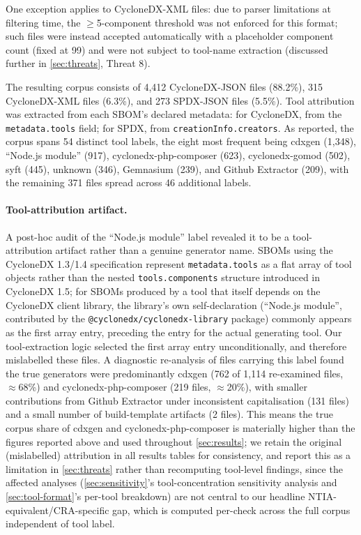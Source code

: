 \documentclass[11pt]{article}
\begin{document}
One exception applies to CycloneDX-XML files: due to parser limitations at filtering time, the $\geq$5-component threshold was not enforced for this format; such files were instead accepted automatically with a placeholder component count (fixed at 99) and were not subject to tool-name extraction (discussed further in \cref{sec:threats}, Threat 8).

The resulting corpus consists of 4,412 CycloneDX-JSON files (88.2\%), 315 CycloneDX-XML files (6.3\%), and 273 SPDX-JSON files (5.5\%). Tool attribution was extracted from each SBOM's declared metadata: for CycloneDX, from the \texttt{metadata.tools} field; for SPDX, from \texttt{creationInfo.creators}. As reported, the corpus spans 54 distinct tool labels, the eight most frequent being cdxgen (1,348), ``Node.js module'' (917), cyclonedx-php-composer (623), cyclonedx-gomod (502), syft (445), unknown (346), Gemnasium (239), and Github Extractor (209), with the remaining 371 files spread across 46 additional labels.

\paragraph{Tool-attribution artifact.} A post-hoc audit of the ``Node.js module'' label revealed it to be a tool-attribution artifact rather than a genuine generator name. SBOMs using the CycloneDX 1.3/1.4 specification represent \texttt{metadata.tools} as a flat array of tool objects rather than the nested \texttt{tools.components} structure introduced in CycloneDX 1.5; for SBOMs produced by a tool that itself depends on the CycloneDX client library, the library's own self-declaration (``Node.js module'', contributed by the \texttt{@cyclonedx/cyclonedx-library} package) commonly appears as the first array entry, preceding the entry for the actual generating tool. Our tool-extraction logic selected the first array entry unconditionally, and therefore mislabelled these files. A diagnostic re-analysis of files carrying this label found the true generators were predominantly cdxgen (762 of 1,114 re-examined files, $\approx$68\%) and cyclonedx-php-composer (219 files, $\approx$20\%), with smaller contributions from Github Extractor under inconsistent capitalisation (131 files) and a small number of build-template artifacts (2 files). This means the true corpus share of cdxgen and cyclonedx-php-composer is materially higher than the figures reported above and used throughout \cref{sec:results}; we retain the original (mislabelled) attribution in all results tables for consistency, and report this as a limitation in \cref{sec:threats} rather than recomputing tool-level findings, since the affected analyses (\cref{sec:sensitivity}'s tool-concentration sensitivity analysis and \cref{sec:tool-format}'s per-tool breakdown) are not central to our headline NTIA-equivalent/CRA-specific gap, which is computed per-check across the full corpus independent of tool label.
\end{document}
